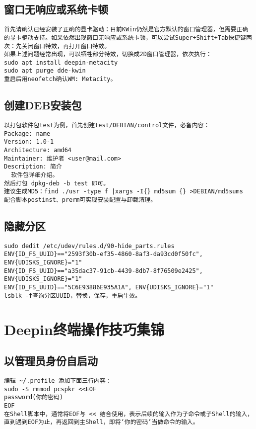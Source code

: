 \documentclass[a4paper,fontset=fandol,zihao=-4,linespread=1.2]{ctexbook}
\begin{document}
\section{窗口无响应或系统卡顿}
\begin{lstlisting}
首先请确认已经安装了正确的显卡驱动：目前KWin仍然是官方默认的窗口管理器，但需要正确的显卡驱动支持。如果依然出现窗口无响应或系统卡顿，可以尝试Super+Shift+Tab快捷键两次：先关闭窗口特效，再打开窗口特效。
如果上述问题经常出现，可以牺牲部分特效，切换成2D窗口管理器，依次执行：
sudo apt install deepin-metacity
sudo apt purge dde-kwin
重启后用neofetch确认WM: Metacity。
\end{lstlisting}

\section{创建DEB安装包}
\begin{lstlisting}
以打包软件包test为例，首先创建test/DEBIAN/control文件，必备内容：
Package: name
Version: 1.0-1
Architecture: amd64
Maintainer: 维护者 <user@mail.com>
Description: 简介
  软件包详细介绍。
然后打包 dpkg-deb -b test 即可。
建议生成MD5：find ./usr -type f |xargs -I{} md5sum {} >DEBIAN/md5sums
配合脚本postinst、prerm可实现安装配置与卸载清理。
\end{lstlisting}

\section{隐藏分区}
\begin{lstlisting}
sudo dedit /etc/udev/rules.d/90-hide_parts.rules
ENV{ID_FS_UUID}=="2593f30b-ef35-4860-8af3-da93cd0f50fc", ENV{UDISKS_IGNORE}="1"
ENV{ID_FS_UUID}=="a35dac37-91cb-4439-8db7-8f76509e2425", ENV{UDISKS_IGNORE}="1"
ENV{ID_FS_UUID}=="5C6E93886E935A1A", ENV{UDISKS_IGNORE}="1"
lsblk -f查询分区UUID，替换，保存，重启生效。
\end{lstlisting}


\chapter{Deepin终端操作技巧集锦}

\section{以管理员身份自启动}
\begin{lstlisting}
编辑 ~/.profile 添加下面三行内容：
sudo -S rmmod pcspkr <<EOF
password(你的密码)
EOF
在Shell脚本中，通常将EOF与 << 结合使用，表示后续的输入作为子命令或子Shell的输入，直到遇到EOF为止，再返回到主Shell，即将‘你的密码’当做命令的输入。
\end{lstlisting}
\end{document}
